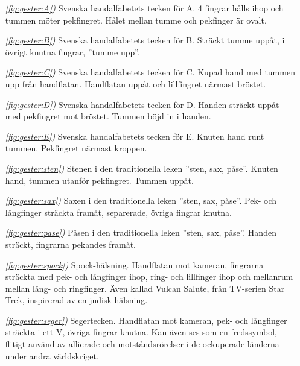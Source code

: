 \documentclass[../rapport_MVEX01-11-05]{subfiles}
\begin{document}
\begin{enumerate}
 	\item[\itshape\ref{fig:gester:A}\upshape)] Svenska handalfabetets tecken för A. 4 fingrar hålls ihop och tummen
  möter pekfingret. Hålet mellan tumme och pekfinger är ovalt.

  \item[\itshape\ref{fig:gester:B}\upshape)] Svenska handalfabetets tecken för B. Sträckt tumme uppåt, i övrigt knutna fingrar, ''tumme upp''.

  \item[\itshape\ref{fig:gester:C}\upshape)] Svenska handalfabetets tecken för C. Kupad hand med tummen upp från handflatan. Handflatan uppåt
  och lillfingret närmast bröstet. 

  \item[\itshape\ref{fig:gester:D}\upshape)] Svenska handalfabetets tecken för D. Handen sträckt uppåt med pekfingret mot bröstet. Tummen böjd
  in i handen.

  \item[\itshape\ref{fig:gester:E}\upshape)] Svenska handalfabetets tecken för E. Knuten hand runt tummen. Pekfingret närmast kroppen. 

  \item[\itshape\ref{fig:gester:sten}\upshape)] Stenen i den traditionella leken ''sten, sax, påse''. Knuten hand, tummen utanför pekfingret. Tummen uppåt.

  \item[\itshape\ref{fig:gester:sax}\upshape)] Saxen i den traditionella leken ''sten, sax, påse''. Pek- och långfinger sträckta framåt, separerade, övriga
  fingrar knutna.

  \item[\itshape\ref{fig:gester:pase}\upshape)] Påsen i den traditionella leken ''sten, sax, påse''. Handen sträckt, fingrarna pekandes framåt.

  \item[\itshape\ref{fig:gester:spock}\upshape)] Spock-hälsning. Handflatan mot kameran, fingrarna sträckta med pek- och
  långfinger ihop, ring- och lillfinger ihop och mellanrum mellan
  lång- och ringfinger. Även kallad Vulcan Salute, från TV-serien Star
  Trek, inspirerad av en judisk hälsning.

  \item[\itshape\ref{fig:gester:seger}\upshape)] Segertecken. Handflatan mot kameran, pek- och långfinger sträckta i
  ett V, övriga fingrar knutna. Kan även ses som en fredssymbol,
  flitigt använd av allierade och motståndsrörelser i de ockuperade
  länderna under andra världskriget.
\end{enumerate}
\end{document}
